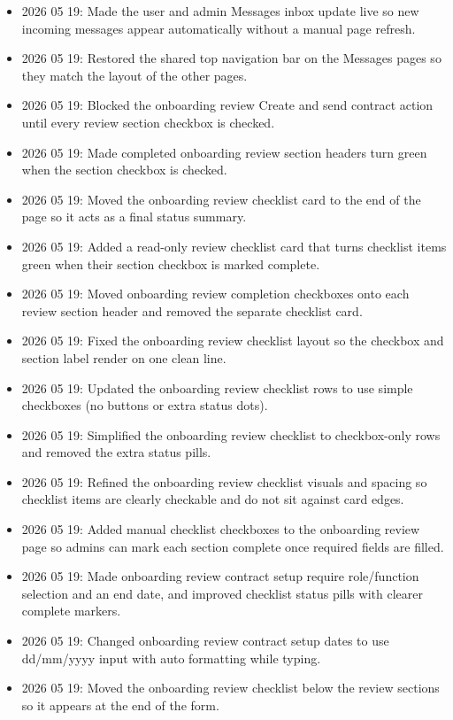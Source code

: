 \documentclass[11pt]{article}
\begin{document}
\begin{itemize}
    \item 2026 05 19: Made the user and admin Messages inbox update live so new incoming messages appear automatically without a manual page refresh.
    \item 2026 05 19: Restored the shared top navigation bar on the Messages pages so they match the layout of the other pages.
    \item 2026 05 19: Blocked the onboarding review Create and send contract action until every review section checkbox is checked.
    \item 2026 05 19: Made completed onboarding review section headers turn green when the section checkbox is checked.
    \item 2026 05 19: Moved the onboarding review checklist card to the end of the page so it acts as a final status summary.
    \item 2026 05 19: Added a read-only review checklist card that turns checklist items green when their section checkbox is marked complete.
    \item 2026 05 19: Moved onboarding review completion checkboxes onto each review section header and removed the separate checklist card.
    \item 2026 05 19: Fixed the onboarding review checklist layout so the checkbox and section label render on one clean line.
    \item 2026 05 19: Updated the onboarding review checklist rows to use simple checkboxes (no buttons or extra status dots).
    \item 2026 05 19: Simplified the onboarding review checklist to checkbox-only rows and removed the extra status pills.
    \item 2026 05 19: Refined the onboarding review checklist visuals and spacing so checklist items are clearly checkable and do not sit against card edges.
    \item 2026 05 19: Added manual checklist checkboxes to the onboarding review page so admins can mark each section complete once required fields are filled.
    \item 2026 05 19: Made onboarding review contract setup require role/function selection and an end date, and improved checklist status pills with clearer complete markers.
    \item 2026 05 19: Changed onboarding review contract setup dates to use dd/mm/yyyy input with auto formatting while typing.
    \item 2026 05 19: Moved the onboarding review checklist below the review sections so it appears at the end of the form.

\end{itemize}
\end{document}
